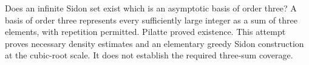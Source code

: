 Does an infinite Sidon set exist which is an asymptotic basis of order three? A basis of order three represents every sufficiently large integer as a sum of three elements, with repetition permitted. Pilatte proved existence. This attempt proves necessary density estimates and an elementary greedy Sidon construction at the cubic-root scale. It does not establish the required three-sum coverage.
